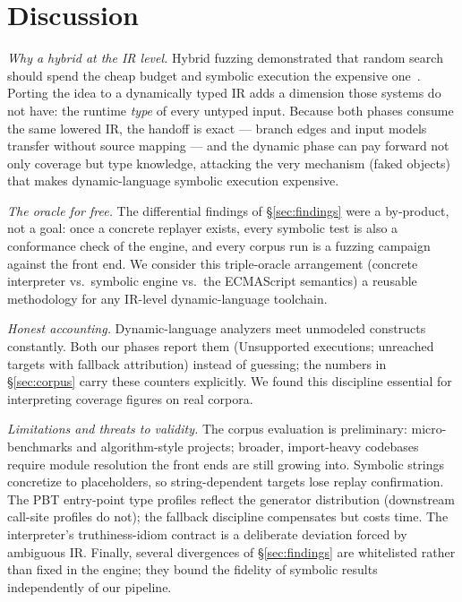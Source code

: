 \documentclass[sigconf,nonacm,screen]{acmart}
\begin{document}
\section{Discussion}

\emph{Why a hybrid at the IR level.} Hybrid fuzzing demonstrated that
random search should spend the cheap budget and symbolic execution the
expensive one~\cite{majumdar2007,stephens2016,yun2018}. Porting the idea
to a dynamically typed IR adds a dimension those systems do not have: the
runtime \emph{type} of every untyped input. Because both phases consume the
same lowered IR, the handoff is exact --- branch edges and input models
transfer without source mapping --- and the dynamic phase can pay forward
not only coverage but type knowledge, attacking the very mechanism (faked
objects) that makes dynamic-language symbolic execution expensive.

\emph{The oracle for free.} The differential findings of
\S\ref{sec:findings} were a by-product, not a goal: once a concrete
replayer exists, every symbolic test is also a conformance check of the
engine, and every corpus run is a fuzzing campaign against the front end.
We consider this triple-oracle arrangement (concrete interpreter vs.\
symbolic engine vs.\ the ECMAScript semantics) a reusable methodology for
any IR-level dynamic-language toolchain.

\emph{Honest accounting.} Dynamic-language analyzers meet unmodeled
constructs constantly. Both our phases report them (\textsf{Unsupported}
executions; unreached targets with fallback attribution) instead of
guessing; the numbers in \S\ref{sec:corpus} carry these counters
explicitly. We found this discipline essential for interpreting coverage
figures on real corpora.

\emph{Limitations and threats to validity.} The corpus evaluation is
preliminary: micro-benchmarks and algorithm-style projects; broader,
import-heavy codebases require module resolution the front ends are still
growing into. Symbolic strings concretize to placeholders, so
string-dependent targets lose replay confirmation. The PBT entry-point
type profiles reflect the generator distribution (downstream call-site
profiles do not); the fallback discipline compensates but costs time.
The interpreter's truthiness-idiom contract is a deliberate deviation
forced by ambiguous IR. Finally, several divergences of
\S\ref{sec:findings} are whitelisted rather than fixed in the engine; they
bound the fidelity of symbolic results independently of our pipeline.
\end{document}
